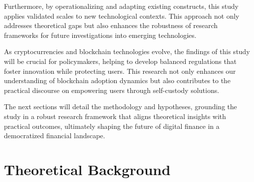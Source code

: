 \documentclass[twocolumn]{article}
\begin{document}
Furthermore, by operationalizing and adapting existing constructs, this study applies validated scales to new technological contexts. This approach not only addresses theoretical gaps but also enhances the robustness of research frameworks for future investigations into emerging technologies.

As cryptocurrencies and blockchain technologies evolve, the findings of this study will be crucial for policymakers, helping to develop balanced regulations that foster innovation while protecting users. This research not only enhances our understanding of blockchain adoption dynamics but also contributes to the practical discourse on empowering users through self-custody solutions.

The next sections will detail the methodology and hypotheses, grounding the study in a robust research framework that aligns theoretical insights with practical outcomes, ultimately shaping the future of digital finance in a democratized financial landscape.

\section{Theoretical Background}
\end{document}
